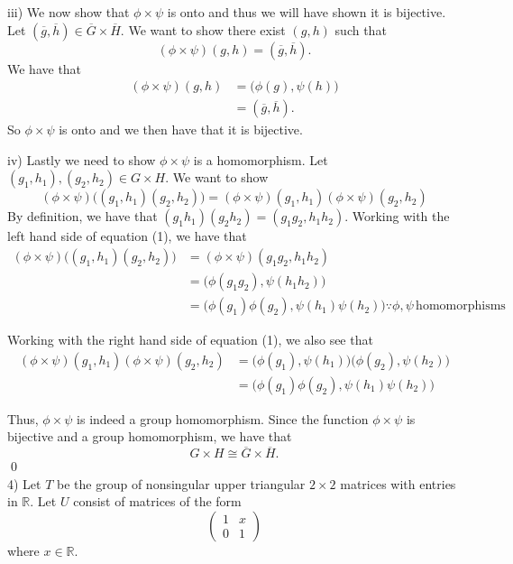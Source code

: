 \documentclass{article}
\begin{document}
iii) We now show that $\phi \times \psi$ is onto and thus we will have shown it is bijective. Let $(\overline{g}, \overline{h}) \in \overline{G} \times \overline{H}$. We want to show there exist $(g, h)$ such that
$$(\phi \times \psi)(g, h) = (\overline{g}, \overline{h}).$$
We have that
\begin{align*}
	(\phi \times \psi)(g, h) &= \big(\phi(g), \psi(h) \big) \\
	&= (\overline{g}, \overline{h}).
\end{align*}
So $\phi \times \psi$ is onto and we then have that it is bijective.

iv) Lastly we need to show $\phi \times \psi$ is a homomorphism. Let $(g_1, h_1), (g_2, h_2) \in G \times H$. We want to show
\begin{equation}
(\phi \times \psi)\big((g_1, h_1)(g_2, h_2)\big) = (\phi \times \psi)(g_1, h_1) (\phi \times \psi)(g_2, h_2)
\end{equation}
By definition, we have that $(g_1h_1)(g_2h_2) = (g_1g_2, h_1h_2)$. Working with the left hand side of equation (1), we have that
\begin{align*}
	(\phi \times \psi)\big((g_1, h_1)(g_2, h_2)\big) &= (\phi \times \psi)(g_1g_2, h_1h_2) \\
	&= \big(\phi(g_1g_2), \psi(h_1h_2)\big) \\
	&= \big(\phi(g_1)\phi(g_2), \psi(h_1)\psi(h_2)\big) \because \phi, \psi \, \text{homomorphisms}
\end{align*}

Working with the right hand side of equation (1), we also see that
\begin{align*}
	(\phi \times \psi)(g_1, h_1) (\phi \times \psi)(g_2, h_2) &= \big(\phi(g_1), \psi(h_1)\big)\big(\phi(g_2), \psi(h_2)\big) \\
	&= \big(\phi(g_1)\phi(g_2), \psi(h_1)\psi(h_2)\big)
\end{align*}

Thus, $\phi \times \psi$ is indeed a group homomorphism. Since the function $\phi \times \psi$ is bijective and a group homomorphism, we have that $$G \times H \cong \overline{G} \times \overline{H}.$$ \qed \\

4) Let $T$ be the group of nonsingular upper triangular $2 \times 2$ matrices with entries in $\mathbb{R}$. Let $U$ consist of matrices of the form 
$$\begin{pmatrix}
	1 & x \\
	0 & 1
\end{pmatrix}$$
where $x \in \mathbb{R}$.
\end{document}
